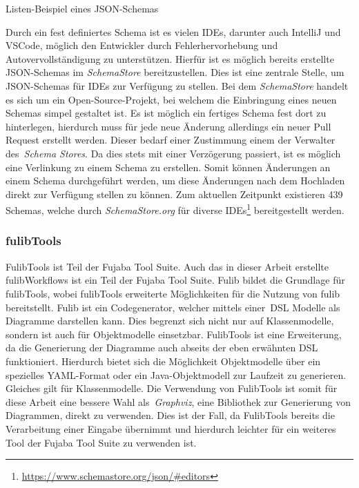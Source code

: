 \begin{listing}[!ht]
    \inputminted{json}{listings/2.2.1/list.schema.json}
    \caption{Listen-Beispiel eines JSON-Schemas}
    \label{listing:listSchema}
\end{listing}

Durch ein fest definiertes Schema ist es vielen IDEs, darunter auch IntelliJ und VSCode,
möglich den Entwickler durch Fehlerhervorhebung und Autovervollständigung zu unterstützen.
Hierfür ist es möglich bereits erstellte JSON-Schemas im \textit{SchemaStore} bereitzustellen.
Dies ist eine zentrale Stelle, um JSON-Schemas für IDEs zur Verfügung zu stellen.
Bei dem \textit{SchemaStore} handelt es sich um ein Open-Source-Projekt, bei welchem die Einbringung eines neuen Schemas simpel gestaltet ist.
Es ist möglich ein fertiges Schema fest dort zu hinterlegen, hierdurch muss für jede neue Änderung allerdings ein neuer Pull Request erstellt werden.
Dieser bedarf einer Zustimmung einem der Verwalter des~\textit{Schema Stores}.
Da dies stets mit einer Verzögerung passiert, ist es möglich eine Verlinkung zu einem Schema zu erstellen.
Somit können Änderungen an einem Schema durchgeführt werden, um diese Änderungen nach dem Hochladen direkt zur Verfügung stellen zu können.
Zum aktuellen Zeitpunkt existieren 439 Schemas, welche durch \textit{SchemaStore.org} für diverse IDEs\footnote{\url{https://www.schemastore.org/json/#editors}}
bereitgestellt werden\cite*{schemaStore}.

\subsubsection{fulibTools}

FulibTools ist Teil der Fujaba Tool Suite.
Auch das in dieser Arbeit erstellte fulibWorkflows ist ein Teil der Fujaba Tool Suite.
Fulib bildet die Grundlage für fulibTools, wobei fulibTools erweiterte Möglichkeiten für die Nutzung von fulib bereitstellt.
Fulib ist ein Codegenerator, welcher mittels einer~\ac{DSL} Modelle als Diagramme darstellen kann\cite*{fulib}.
Dies begrenzt sich nicht nur auf Klassenmodelle, sondern ist auch für Objektmodelle einsetzbar.
FulibTools ist eine Erweiterung, da die Generierung der Diagramme auch abseits der eben erwähnten DSL funktioniert\cite*{fulibTools}.
Hierdurch bietet sich die Möglichkeit Objektmodelle über ein spezielles YAML-Format oder ein Java-Objektmodell zur Laufzeit zu generieren.
Gleiches gilt für Klassenmodelle.
Die Verwendung von FulibTools ist somit für diese Arbeit eine bessere Wahl als~\textit{Graphviz}, eine Bibliothek zur Generierung von Diagrammen, direkt zu verwenden.
Dies ist der Fall, da FulibTools bereits die Verarbeitung einer Eingabe übernimmt und hierdurch leichter für ein weiteres Tool der Fujaba Tool Suite zu verwenden ist.
